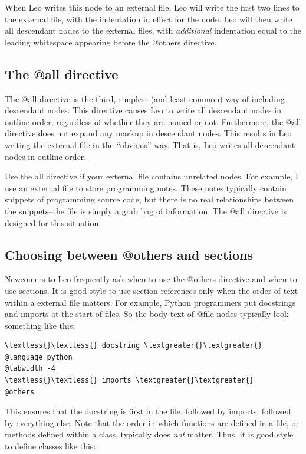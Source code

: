 \documentclass[a4paper,10pt,english]{sphinxmanual}
\begin{document}
When Leo writes this node to an external file, Leo will write the first two
lines to the external file, with the indentation in effect for the node. Leo
will then write all descendant nodes to the external files, with \emph{additional}
indentation equal to the leading whitespace appearing before the @others
directive.


\subsection{The @all directive}
\label{intro:the-all-directive}
The @all directive is the third, simplest (and least common) way of including
descendant nodes. This directive causes Leo to write all descendant nodes in
outline order, regardless of whether they are named or not. Furthermore, the
@all directive does not expand any markup in descendant nodes. This results in
Leo writing the external file in the ``obvious'' way. That is, Leo writes all
descendant nodes in outline order.

Use the all directive if your external file contains unrelated nodes. For
example, I use an external file to store programming notes. These notes
typically contain snippets of programming source code, but there is no real
relationships between the snippets--the file is simply a grab bag of
information. The @all directive is designed for this situation.


\subsection{Choosing between @others and sections}
\label{intro:choosing-between-others-and-sections}
Newcomers to Leo frequently ask when to use the @others directive and when to
use sections. It is good style to use section references only when the order of
text within a external file matters. For example, Python programmers put
docstrings and imports at the start of files. So the body text of
@file nodes typically look something like this:

\begin{Verbatim}[commandchars=\\\{\}]
\textless{}\textless{} docstring \textgreater{}\textgreater{}
@language python
@tabwidth -4
\textless{}\textless{} imports \textgreater{}\textgreater{}
@others
\end{Verbatim}

This ensures that the docstring is first in the file, followed by imports,
followed by everything else. Note that the order in which functions are defined
in a file, or methods defined within a class, typically does \emph{not} matter. Thus,
it is good style to define classes like this:
\end{document}
